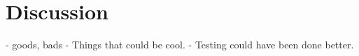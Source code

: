 \section*{Discussion}

- goods, bads
- Things that could be cool.
- Testing could have been done better.